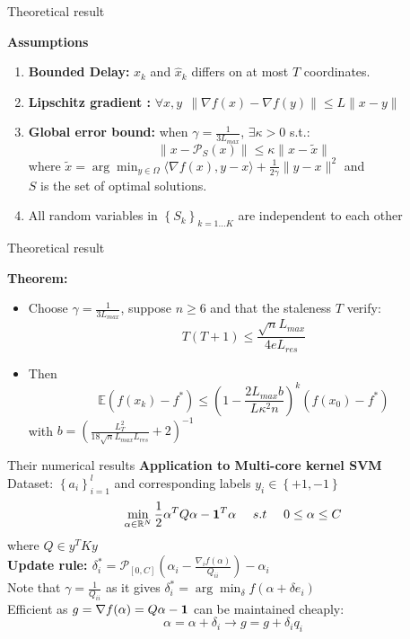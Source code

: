 \documentclass{beamer}
\begin{document}
\begin{frame}{Theoretical result}

{\bf Assumptions}
\begin{enumerate}\itemsep1em
	\item {\bf Bounded Delay:} $x_k$ and $\widehat x_k$ differs on at most $T$ coordinates.
	\item {\bf Lipschitz gradient :} $\forall x, y~~ \|\nabla f(x) - \nabla f(y)\| \le L \|x-y\|$
	\item {\bf Global error bound:} when $\gamma = \frac{1}{3L_{max}}$, $\exists \kappa > 0$ s.t.:
	\[
	   \|x - \mathcal P_S(x)\| \le \kappa\|x-\widetilde x\|
	\]
	where $\widetilde x = \arg\min_{y \in \Omega} \langle \nabla f(x), y-x \rangle + \frac{1}{2\gamma}\|y-x\|^2$ and\\ $S$ is the set of optimal solutions.
	\item All random variables in $\left \{ S_k \right \}_{k=1\dots K}$ are independent to each other
\end{enumerate}
	
\end{frame}

\begin{frame}{Theoretical result}

{\bf Theorem:}
\begin{itemize}
	\item[] Choose $\gamma = \frac{1}{3L_{max}}$, suppose $n \ge 6$ and that the staleness $T$ verify:
	\[
		T(T+1) \le \frac{\sqrt n L_{max}}{4eL_{res}}
	\] 
	\item[] Then
	\[ 
		\mathbb E(f(x_k) - f^*) \le \left(1 - \frac{2L_{max}b}{L\kappa^2n}\right)^k ( f(x_0) - f^*)
	\]with $b = \left(\frac{L_T^2}{18 \sqrt n L_{max} L_{res}}+ 2\right)^{-1}$ 
\end{itemize}

	
\end{frame}

\begin{frame}{Their numerical results}
{\bf Application to Multi-core kernel SVM\\[1em]}
Dataset: $\left \{ a_i \right \}_{i=1}^l$ and corresponding labels $y_i\in \left \{ +1, -1 \right \}$
\[
\min_{\alpha\in\mathbb R^N} \frac{1}{2} \alpha^TQ\alpha - {\bf 1}^T\alpha ~~~~s.t~~~~ 0 \le \alpha \le C
\]
where $Q \in y^TKy$\\[1em]

{\bf Update rule: $\delta^*_i = \mathcal P_{\left[0, C\right]}(\alpha_i - \frac{\nabla_if(\alpha)}{Q_{ii}})-\alpha_i$}\\[.5em]
{\color{gray}Note that $\gamma = \frac{1}{Q_{ii}}$ as it gives $\delta^*_i = \arg\min_\delta f(\alpha + \delta e_i)$ }\\[1em]

Efficient as $g = \nabla f(\alpha) = Q\alpha - {\bf 1}$ can be maintained cheaply:
\[\alpha = \alpha + \delta_i \rightarrow g = g + \delta_iq_i \] 
	
\end{frame}
\end{document}
